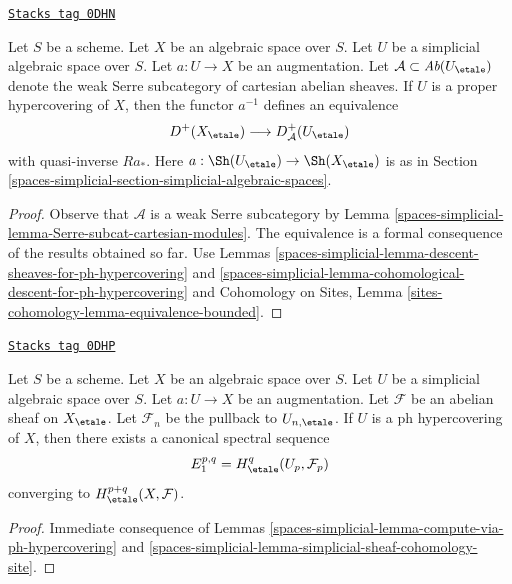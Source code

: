 \begin{lemma}
\label{spaces-simplicial-lemma-ph-hypercovering-equivalence-bounded}
\href{https://stacks.math.columbia.edu/tag/0DHN}{\texttt{Stacks tag 0DHN}}

Let $S$ be a scheme. Let $X$ be an algebraic space over $S$.
Let $U$ be a simplicial algebraic space over $S$. Let $a : U \to X$
be an augmentation.
Let $\mathcal{A} \subset \textit{Ab}(U_\etale)$
denote the weak Serre subcategory of cartesian abelian sheaves.
If $U$ is a proper hypercovering of $X$, then
the functor $a^{-1}$ defines an equivalence
$$
D^+(X_\etale) \longrightarrow D_\mathcal{A}^+(U_\etale)
$$
with quasi-inverse $Ra_*$. Here $a : \Sh(U_\etale) \to \Sh(X_\etale)$
is as in Section \ref{spaces-simplicial-section-simplicial-algebraic-spaces}.
\end{lemma}

\begin{proof}
Observe that $\mathcal{A}$ is a weak Serre subcategory by
Lemma \ref{spaces-simplicial-lemma-Serre-subcat-cartesian-modules}.
The equivalence is a
formal consequence of the results obtained so far. Use
Lemmas \ref{spaces-simplicial-lemma-descent-sheaves-for-ph-hypercovering} and
\ref{spaces-simplicial-lemma-cohomological-descent-for-ph-hypercovering} and
Cohomology on Sites, Lemma \ref{sites-cohomology-lemma-equivalence-bounded}.
\end{proof}

\begin{lemma}
\label{spaces-simplicial-lemma-spectral-sequence-ph-hypercovering}
\href{https://stacks.math.columbia.edu/tag/0DHP}{\texttt{Stacks tag 0DHP}}

Let $S$ be a scheme. Let $X$ be an algebraic space over $S$.
Let $U$ be a simplicial algebraic space over $S$. Let $a : U \to X$
be an augmentation. Let $\mathcal{F}$ be an abelian sheaf
on $X_\etale$. Let $\mathcal{F}_n$ be the pullback to $U_{n, \etale}$.
If $U$ is a ph hypercovering of $X$, then
there exists a canonical spectral sequence
$$
E_1^{p, q} = H^q_\etale(U_p, \mathcal{F}_p)
$$
converging to $H^{p + q}_\etale(X, \mathcal{F})$.
\end{lemma}

\begin{proof}
Immediate consequence of Lemmas \ref{spaces-simplicial-lemma-compute-via-ph-hypercovering}
and \ref{spaces-simplicial-lemma-simplicial-sheaf-cohomology-site}.
\end{proof}




